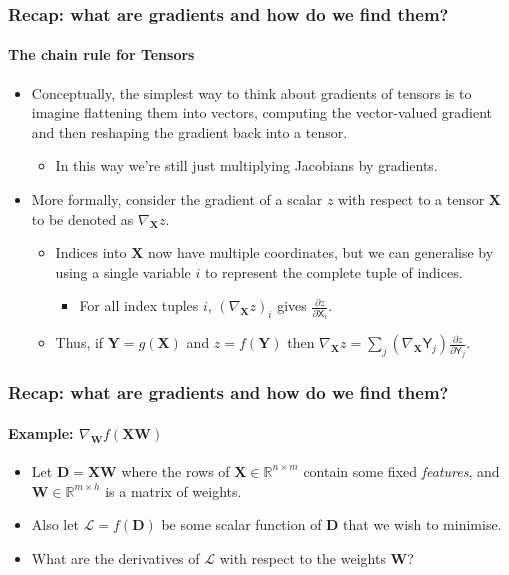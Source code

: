 \documentclass[\beamerclass]{beamer}
\begin{document}
\begin{frame}
\frametitle{Recap: what are gradients and how do we find them?}
\framesubtitle{The chain rule for Tensors}
\begin{itemize}
	\item<+-> Conceptually, the simplest way to think about gradients of tensors is to imagine flattening them into vectors, computing the vector-valued gradient and then reshaping the gradient back into a tensor. 
	\begin{itemize}
		\item<+-> In this way we're still just multiplying Jacobians by gradients. 
	\end{itemize}
	\item<+-> More formally, consider the gradient of a scalar $z$ with respect to a tensor $\mathbf{X}$ to be denoted as $\nabla_{\mathbf{X}}z$. 
	\begin{itemize}
		\item<+-> Indices into $\mathbf{X}$ now have multiple coordinates, but we can generalise by using a single variable $i$ to represent the complete tuple of indices. 
		\begin{itemize}
			\item<+-> For all index tuples $i$, $(\nabla_{\mathbf{X}}z)_i$ gives $\frac{\partial z}{\partial \mathsf{X}_i}$.
		\end{itemize}
		\item<+-> Thus, if $\mathbf{Y} = g(\mathbf{X})$ and $z = f(\mathbf{Y})$ then $\nabla_{\mathbf{X}}z = \sum_j (\nabla_{\mathbf{X}}\mathsf{Y}_j)\frac{\partial z}{\partial \mathsf{Y}_j}$.
	\end{itemize}
\end{itemize}


\end{frame}

\begin{frame}
\frametitle{Recap: what are gradients and how do we find them?}
\framesubtitle{Example: $\nabla_{\bm W} f(\bm X \bm W)$}
\begin{itemize}
\item<1-> Let $\bm D = \bm X \bm W$ where the rows of $\bm X \in \mathbb{R}^{n \times m}$ contain some fixed \emph{features}, and $\bm W \in \mathbb{R}^{m \times h}$ is a matrix of weights.
\item<1-> Also let $\mathcal{L} = f(\bm D)$ be some scalar function of $\bm D$ that we wish to minimise. 
\item<2-> What are the derivatives of $\mathcal{L}$ with respect to the weights $\bm W$?
\end{itemize}
\end{frame}
\end{document}
